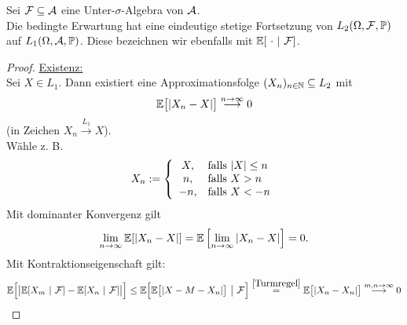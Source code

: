 \setcounter{satz}{5} %
\begin{proposition}\label{Prop1.6} %
	Sei $\mathcal{F}\subseteq\mathcal{A}$ eine Unter-$\sigma$-Algebra von $\mathcal{A}$.\\
	Die bedingte Erwartung hat eine eindeutige stetige Fortsetzung von $L_2(\Omega,\mathcal{F},\mathbb{P})$ auf $L_1(\Omega,\mathcal{A},\mathbb{P})$.
	Diese bezeichnen wir ebenfalls mit $\mathbb{E}[~\cdot~|~\mathcal{F}]$.
\end{proposition}

\begin{proof}
	\underline{Existenz:}\\
	Sei $X\in L_1$. Dann existiert eine Approximationsfolge $(X_n)_{n\in\mathbb{N}}\subseteq L_2$ mit 
	\[\mathbb{E}\big[|X_n-X|\big]\stackrel{n\to\infty}{\longrightarrow}0\] 
	(in Zeichen $X_n\stackrel{L_1}{\longrightarrow} X$).\\
	Wähle z. B.
	\begin{align*}
		X_n:=\left\lbrace\begin{array}{cl}
			X, & \text{falls } |X|\leq n\\
			n, & \text{falls } X>n\\
			-n, & \text{falls } X<-n
		\end{array}\right.
	\end{align*}
	Mit dominanter Konvergenz gilt 
	\begin{align*}
		\lim\limits_{n\to\infty}\mathbb{E}[|X_n-X|]=\mathbb{E}\left[\lim\limits_{n\to\infty}|X_n-X|\right]=0.
	\end{align*}
	Mit Kontraktionseigenschaft gilt:
	\begin{align*}
		\mathbb{E}\Big[\big|\mathbb{E}[X_m~|~\mathcal{F}]-\mathbb{E}[X_n~|~\mathcal{F}]\big|\Big]
		\leq\mathbb{E}\Big[\mathbb{E}\big[|X-M-X_n|\big]~\big|~\mathcal{F}\Big]
		\stackrel{\eqref{Turmregel}}{=}
		\mathbb{E}\big[|X_n-X_n|\big]
		\stackrel{m,n\to\infty}{\longrightarrow}
		0
	\end{align*}
	

\end{proof}
